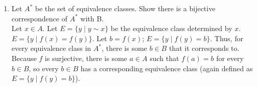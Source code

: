 \documentclass{article}
\begin{document}
\begin{enumerate}
\begin{enumerate}
                  \item Let $A^{*}$ be the set of equivalence classes. Show there is a bijective correspondence of $A^{*}$ with B.\\
                        Let $x \in A$. Let $E = \{y \mid y \sim x\}$ be the equivalence class determined by $x$. $E = \{y \mid f(x) = f(y)\}$. Let $b = f(x)$; $E = \{y \mid f(y) = b\}$. Thus, for every equivalence class in $A^{*}$, there is some $b \in B$ that it corresponds to. Because $f$ is surjective, there is some $a \in A$ such that $f(a) = b$ for every $b \in B$, so every $b \in B$ has a corresponding equivalence class (again defined as $E = \{y \mid f(y) = b\}$). 
            \end{enumerate}
\end{enumerate}
\end{document}
